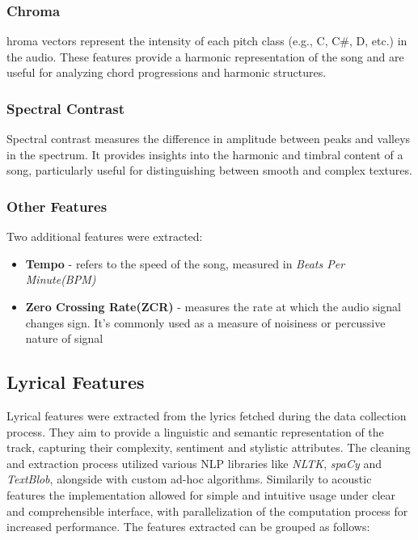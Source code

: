 \subsubsection*{Chroma}
hroma vectors represent the intensity of each pitch class (e.g., C, C#, D,
etc.) in the audio. These features provide a harmonic representation of the
song and are useful for analyzing chord progressions and harmonic structures.

\subsubsection*{Spectral Contrast}
Spectral contrast measures the difference in amplitude between peaks and
valleys in the spectrum. It provides insights into the harmonic and timbral
content of a song, particularly useful for distinguishing between smooth and
complex textures.

\subsubsection*{Other Features}
Two additional features were extracted:
\begin{itemize}
  \item \textbf{Tempo} - refers to the speed of the song, measured in \textit{Beats Per Minute(BPM)}
  \item \textbf{Zero Crossing Rate(ZCR)} - measures the rate at which the audio
    signal changes sign. It's commonly used as a measure of noisiness or
    percussive nature of signal
\end{itemize}


\subsection{Lyrical Features}
\label{sec:lyricalfeatures}

Lyrical features  were extracted from the lyrics fetched during the data
collection process. They aim to provide a linguistic and semantic
representation of the track, capturing their complexity, sentiment and
stylistic  attributes. The cleaning and extraction  process utilized various
NLP libraries like \textit{NLTK}, \textit{spaCy} and \textit{TextBlob},
alongside with custom ad-hoc algorithms. Similarily to acoustic features the
implementation allowed for simple and intuitive usage under clear and
comprehensible interface, with parallelization of the computation process for
increased performance. The features extracted can be grouped as follows:

